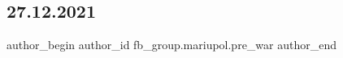  
 
 
 
 

\subsection{27.12.2021}
\label{sec:12_02_2023.fb.fb_group.mariupol.pre_war.10.27_12_2021}

\ifcmt
 author_begin
   author_id fb_group.mariupol.pre_war
 author_end
\fi
